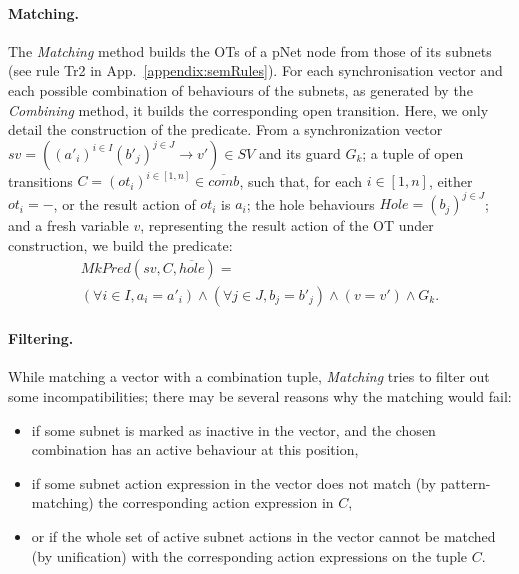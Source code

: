 \documentclass{lncs/llncs}
\begin{document}



\paragraph{Matching.}
The \emph{Matching} method builds the OTs of a pNet node from those of
its subnets (see rule Tr2 in App.~\ref{appendix:semRules}).
For each synchronisation vector and each possible
combination of behaviours of the subnets, as generated by the \emph
{Combining} method, it builds the corresponding open transition.
Here, we only detail the construction of the predicate.
From a synchronization vector
$sv = \left((a'_i)^{i\in I} (b'_j)^{j\in J}\rightarrow v'\right) \in SV$
and its guard $G_k$; a tuple of open transitions
$C = ({ot}_i)^{i \in [1,n]} \in \overline{comb}$, such that, for each $i \in [1,n]$, either $ot_i = -$, or the result action of $ot_i$ is $a_i$; the hole behaviours $\mathit{Hole} = (b_j)^{j \in J}$; and a fresh variable $v$, representing the result action of the OT under construction, we build the predicate:
%
\begin{multline*}
  \mathit{MkPred}(sv, C, \overline{\mathit{hole}}) = 
  \\
  (\forall i\in I, a_i=a'_i) \land
  (\forall j\in J, b_j=b'_j) \land
  (v=v') \land G_k.
\end{multline*}


\paragraph{Filtering.}
While matching a vector with a combination tuple, \emph{Matching}
tries to filter out some incompatibilities; there may be several
reasons why the matching would fail: 
\begin{itemize}
  \item if some subnet is marked as inactive in the vector, and the
    chosen combination has an active behaviour at this position,
  \item if some subnet action expression in the vector does not match (by
    pattern-matching) the corresponding action expression in $C$,
  \item or if the whole set of active subnet actions in the vector
    cannot be matched (by unification) with the corresponding action expressions
      on the tuple $C$.
\end {itemize}
\end{document}
